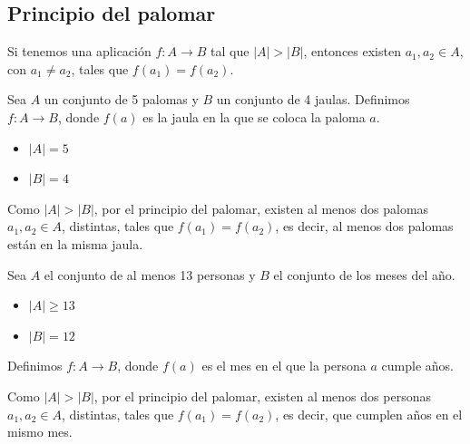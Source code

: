 \documentclass[a4paper,12pt]{article}
\begin{document}
\subsection{Principio del palomar}

\begin{procedimiento}[title=Principio del palomar]
Si tenemos una aplicación $f: A \to B$ tal que $|A| > |B|$, entonces existen $a_1, a_2 \in A$, con $a_1 \neq a_2$, tales que $f(a_1) = f(a_2)$.
\end{procedimiento}

\begin{ejemplo}[title=Ejemplo 1: Palomas en jaulas]
Sea $A$ un conjunto de 5 palomas y $B$ un conjunto de 4 jaulas. Definimos $f: A \to B$, donde $f(a)$ es la jaula en la que se coloca la paloma $a$.

\begin{itemize}
    \item $|A| = 5$
    \item $|B| = 4$
\end{itemize}

Como $|A| > |B|$, por el principio del palomar, existen al menos dos palomas $a_1, a_2 \in A$, distintas, tales que $f(a_1) = f(a_2)$, es decir, al menos dos palomas están en la misma jaula.
\end{ejemplo}

\begin{ejemplo}[title=Ejemplo 2: Cumpleaños en el mismo mes]
Sea $A$ el conjunto de al menos 13 personas y $B$ el conjunto de los meses del año.

\begin{itemize}
    \item $|A| \ge 13$
    \item $|B| = 12$
\end{itemize}

Definimos $f: A \to B$, donde $f(a)$ es el mes en el que la persona $a$ cumple años.

Como $|A| > |B|$, por el principio del palomar, existen al menos dos personas $a_1, a_2 \in A$, distintas, tales que $f(a_1) = f(a_2)$, es decir, que cumplen años en el mismo mes.
\end{ejemplo}
\end{document}
